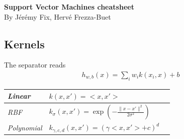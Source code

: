 \documentclass{article}
\begin{document}
\begin{center}{\huge{\textbf{Support Vector Machines cheatsheet}}}\\
	{\large By Jérémy Fix, Hervé Frezza-Buet}
\end{center}
\begin{multicols*}{3}

\section*{Kernels}
The separator reads
\begin{align*}
	h_{w, b}(x) = \sum_i w_i k(x_i, x) + b
\end{align*}
\begin{center}
	\begin{tabular}{lp{5cm} c}
		\textit{Linear} & $k(x, x') = <x, x'>$ \\
		\hline
		\textit{RBF} & $k_\sigma(x, x') = \exp(-\frac{\|x - x'\|^2}{2\sigma^2})$ \\ 
		\hline
		\textit{Polynomial} & $k_{\gamma, c, d}(x, x') = (\gamma <x, x'> + c)^d$ \\ 
	\end{tabular}
\end{center}


\end{multicols*}
\end{document}
